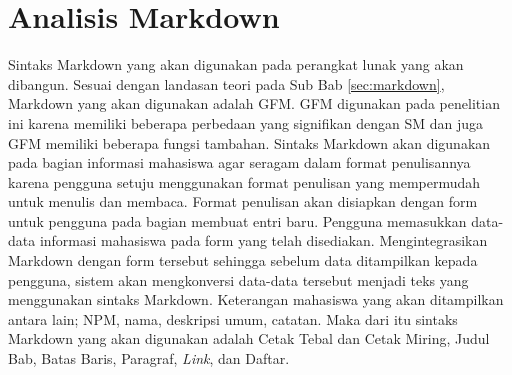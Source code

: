 \section{Analisis Markdown}
\label{sec:analisisMarkdown}
Sintaks Markdown yang akan digunakan pada perangkat lunak yang akan dibangun. Sesuai dengan landasan teori pada Sub Bab \ref{sec:markdown}, Markdown yang akan digunakan adalah GFM. GFM digunakan pada penelitian ini karena memiliki beberapa perbedaan yang signifikan dengan SM dan juga GFM memiliki beberapa fungsi tambahan. Sintaks Markdown akan digunakan pada bagian informasi mahasiswa agar seragam dalam format penulisannya karena pengguna setuju menggunakan format penulisan yang mempermudah untuk menulis dan membaca. Format penulisan akan disiapkan dengan form untuk pengguna pada bagian membuat entri baru. Pengguna memasukkan data-data informasi mahasiswa pada form yang telah disediakan. Mengintegrasikan Markdown dengan form tersebut sehingga sebelum data ditampilkan kepada pengguna, sistem akan mengkonversi data-data tersebut menjadi teks yang menggunakan sintaks Markdown. Keterangan mahasiswa yang akan ditampilkan antara lain; NPM, nama, deskripsi umum, catatan. Maka dari itu sintaks Markdown yang akan digunakan adalah Cetak Tebal dan Cetak Miring, Judul Bab, Batas Baris, Paragraf, {\it Link}, dan Daftar.

